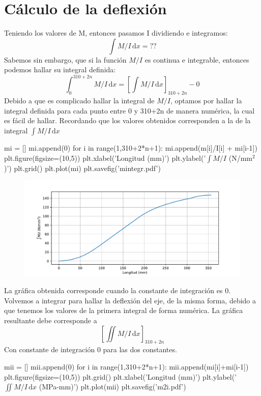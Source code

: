 \documentclass[a4paper,11pt]{report}
\begin{document}
\chapter*{Cálculo de la deflexión}
Teniendo los valores de M, entonces pasamos I dividiendo e integramos:
$$
\int M/I\,\mathrm{d}x = ??
$$
Sabemos sin embargo, que si la función $M/I$ es continua e integrable, entonces podemos hallar su integral definida:
$$
\int_{0}^{310+2n} M/I\,\mathrm{d}x = \left[ \int M/I\,\mathrm{d}x \right]_{310+2n} - 0
$$
Debido a que es complicado hallar la integral de $M/I$, optamos por hallar la integral definida para cada punto entre 0 y 310+2n de manera numérica, la cual es fácil de hallar. Recordando que los valores obtenidos corresponden a la de la integral $\int M/I \, \mathrm{d}x$
\begin{pyglist}[language=python,caption={Primera integral de M/I},style=tango]
mi = []
mi.append(0)
for i in range(1,310+2*n+1):
    mi.append(m[i]/I[i] + mi[i-1])
plt.figure(figsize=(10,5))
plt.xlabel('Longitud (mm)')
plt.ylabel('$\int M/I$ (N/mm$^{2}$)')
plt.grid()
plt.plot(mi)
plt.savefig('mintegr.pdf')
\end{pyglist}
\begin{figure}[H]
\centering
\includegraphics[scale=0.6]{mintegr.pdf}
\end{figure}
La gráfica obtenida corresponde cuando la constante de integración es 0.\\
Volvemos a integrar para hallar la deflexión del eje, de la misma forma, debido a que tenemos los valores de la primera integral de forma numérica. La gráfica resultante debe corresponde a
$$
\left[\iint M/I \,\mathrm{d}x\right]_{310+2n} 
$$
Con constante de integración 0 para las dos constantes.
\begin{pyglist}[language=python,caption={Segunda integral de M/I},style=tango]
mii = []
mii.append(0)
for i in range(1,310+2*n+1):
    mii.append(mi[i]+mi[i-1])
plt.figure(figsize=(10,5))
plt.grid()
plt.xlabel('Longitud (mm)')
plt.ylabel('$ \iint M/I\,\mathrm{d}x $ (MPa-mm)')
plt.plot(mii)
plt.savefig('m2i.pdf')
\end{pyglist}
\end{document}
